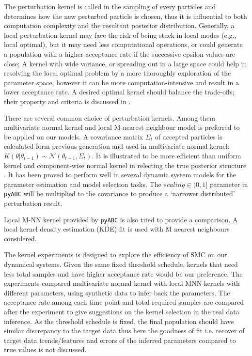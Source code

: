 \documentclass[12pt,a4paper]{report}
\begin{document}
The perturbation kernel is called in the sampling of every particles and determines how the new perturbed particle is chosen, thus it is influential to both computation complexity and the resultant posterior distribution. Generally, a local perturbation kernel may face the risk of being stuck in local modes (e,g., local optimal), but it may need less computational operations, or could generate a population with a higher acceptance rate if the successive epsilon values are close; A kernel with wide variance, or spreading out in a large space could help in resolving the local optimal problem by a more thoroughly exploration of the parameter space, however it can be more computation-intensive and result in a lower acceptance rate. A desired optimal kernel should balance the trade-offs; their property and criteria is discussed in \cite{ref:kernel}.

There are several common choice of perturbation kernels. Among them multivariate normal kernel and local M-nearest neighbour model is preferred to be applied on our models. A covariance matrix $\Sigma_t$ of accepted particles is calculated form previous generation and used in multivariate normal kernel: $K(\theta|\theta_{t-1})\sim\mathcal{N}(\theta_{t-1}, \Sigma_t)$. It is illustrated to be more efficient than uniform kernel and component-wise normal kernel in relecting the true posterior structure \cite{ref:kernel}. It has been proved to perform well in several dynamic system models \cite{ref:abcsysbio, ref:compare, ref:disease} for the parameter estimation and model selection tasks. The $scaling\in(0,1]$ parameter in \verb|pyABC| will be multiplied to the covariance to produce a `narrower distributed' perturbation result.

Local M-NN kernel provided by \verb|pyABC| is also tried to provide a comparison. A local kernel density estimation (KDE) fit is used with M nearest neighbours considered.

The kernel experiments is designed to explore the efficiency of SMC on our dynamical systems. Given the same fixed threshold schedule, kernels that need less total samples and have higher acceptance rate would be our preference. The experiments compared multivariate normal kernel with local MNN kernels with different parameters, using synthetic data to infer back the parameters. The acceptance rate among each time point and total required samples are compared after the experiment to give suggestions on the kernel selection in the real data inference. As the threshold schedule is fixed, the final population should have similar discrepancy to the target data thus here the goodness of fit i.e. recover of target data trends/features and errors of the inferred parameters compared to true values is not discussed.
\end{document}
